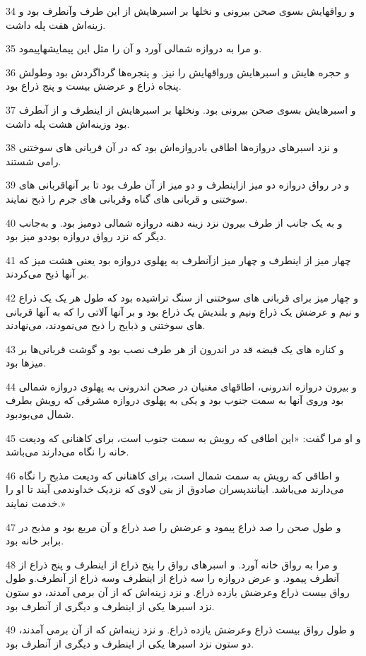 \par 34 و رواقهایش بسوی صحن بیرونی و نخلها بر اسبرهایش از این طرف وآنطرف بود و زینه‌اش هفت پله داشت.
\par 35 و مرا به دروازه شمالی آورد و آن را مثل این پیمایشهاپیمود.
\par 36 و حجره هایش و اسبرهایش ورواقهایش را نیز. و پنجره‌ها گرداگردش بود وطولش پنجاه ذراع و عرضش بیست و پنج ذراع بود.
\par 37 و اسبرهایش بسوی صحن بیرونی بود. ونخلها بر اسبرهایش از اینطرف و از آنطرف بود وزینه‌اش هشت پله داشت.
\par 38 و نزد اسبرهای دروازه‌ها اطاقی بادروازه‌اش بود که در آن قربانی های سوختنی رامی شستند.
\par 39 و در رواق دروازه دو میز ازاینطرف و دو میز از آن طرف بود تا بر آنهاقربانی های سوختنی و قربانی های گناه وقربانی های جرم را ذبح نمایند.
\par 40 و به یک جانب از طرف بیرون نزد زینه دهنه دروازه شمالی دومیز بود. و به‌جانب دیگر که نزد رواق دروازه بوددو میز بود.
\par 41 چهار میز از اینطرف و چهار میز ازآنطرف به پهلوی دروازه بود یعنی هشت میز که بر آنها ذبح می‌کردند.
\par 42 و چهار میز برای قربانی های سوختنی از سنگ تراشیده بود که طول هر یک یک ذراع و نیم و عرضش یک ذراع ونیم و بلندیش یک ذراع بود و بر آنها آلاتی را که به آنها قربانی های سوختنی و ذبایح را ذبح می‌نمودند، می‌نهادند.
\par 43 و کناره های یک قبضه قد در اندرون از هر طرف نصب بود و گوشت قربانی‌ها بر میزها بود.
\par 44 و بیرون دروازه اندرونی، اطاقهای مغنیان در صحن اندرونی به پهلوی دروازه شمالی بود وروی آنها به سمت جنوب بود و یکی به پهلوی دروازه مشرقی که رویش بطرف شمال می‌بودبود.
\par 45 و او مرا گفت: «این اطاقی که رویش به سمت جنوب است، برای کاهنانی که ودیعت خانه را نگاه می‌دارند می‌باشد.
\par 46 و اطاقی که رویش به سمت شمال است، برای کاهنانی که ودیعت مذبح را نگاه می‌دارند می‌باشد. اینانندپسران صادوق از بنی لاوی که نزدیک خداوندمی آیند تا او را خدمت نمایند.»
\par 47 و طول صحن را صد ذراع پیمود و عرضش را صد ذراع و آن مربع بود و مذبح در برابر خانه بود.
\par 48 و مرا به رواق خانه آورد. و اسبرهای رواق را پنج ذراع از اینطرف و پنج ذراع از آنطرف پیمود. و عرض دروازه را سه ذراع از اینطرف وسه ذراع از آنطرف.و طول رواق بیست ذراع وعرضش یازده ذراع. و نزد زینه‌اش که از آن برمی آمدند، دو ستون نزد اسبرها یکی از اینطرف و دیگری از آنطرف بود.
\par 49 و طول رواق بیست ذراع وعرضش یازده ذراع. و نزد زینه‌اش که از آن برمی آمدند، دو ستون نزد اسبرها یکی از اینطرف و دیگری از آنطرف بود.

